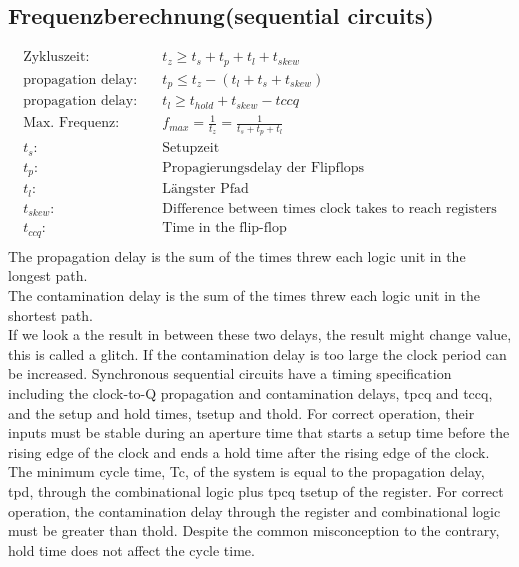 \begin{multicols}{2}
	\subsection{Frequenzberechnung(sequential circuits)}
		\begin{align*}
			\text{Zykluszeit:} \quad & t_z \geq t_s+t_p+t_l + t_{skew} \\
			\text{propagation delay:} \quad & t_p \leq t_z - (t_l + t_s + t_{skew}) \\
			\text{propagation delay:} \quad & t_l \geq t_{hold} + t_{skew} - t{ccq}\\
			\text{Max. Frequenz:} \quad & f_{max} = \frac{1}{t_z} = \frac{1}{t_s+t_p+t_l} \\
			t_s: \quad & \text{Setupzeit} \\
			t_p: \quad & \text{Propagierungsdelay der Flipflops} \\
			t_l: \quad & \text{Längster Pfad} \\
			t_{skew}: \quad & \text{Difference between times clock takes to reach registers}\\
			t_{ccq}: \quad & \text{Time in the flip-flop}\\
		\end{align*}
		The propagation delay is the sum of the times threw each logic unit in the longest path.\\
		The contamination delay is the sum of the times threw each logic unit in the shortest path.\\If we look a the result in between these two delays, the result might change value,
		this is called a glitch. If the contamination delay is too large the clock period can be increased.
		Synchronous sequential circuits have a timing specification including the clock-to-Q propagation and contamination delays, tpcq and tccq, and the setup and hold times, tsetup and thold. For correct operation, their inputs must be stable during an aperture time that starts a setup time before the rising edge of the clock and ends a hold time after the rising edge of the clock. The minimum cycle time, Tc, of the system is equal to the propagation delay, tpd, through the combinational logic plus tpcq   tsetup of the register. For correct operation, the contamination delay through the register and combinational logic must be greater than thold. Despite the common misconception to the contrary, hold time does not affect the cycle time.
	

\end{multicols}
